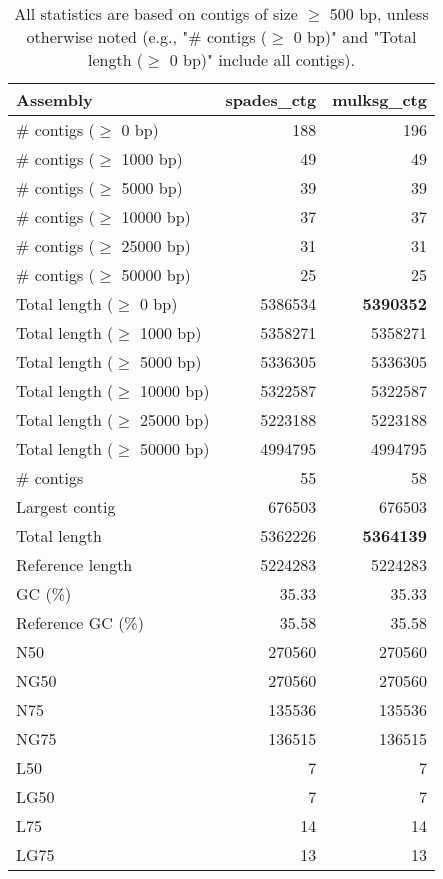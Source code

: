 \documentclass[12pt,a4paper]{article}
\begin{document}
\begin{table}[ht]
\begin{center}
\caption{All statistics are based on contigs of size $\geq$ 500 bp, unless otherwise noted (e.g., "\# contigs ($\geq$ 0 bp)" and "Total length ($\geq$ 0 bp)" include all contigs).}
\begin{tabular}{|l*{2}{|r}|}
\hline
Assembly & spades\_ctg & mulksg\_ctg \\ \hline
\# contigs ($\geq$ 0 bp) & 188 & 196 \\ \hline
\# contigs ($\geq$ 1000 bp) & 49 & 49 \\ \hline
\# contigs ($\geq$ 5000 bp) & 39 & 39 \\ \hline
\# contigs ($\geq$ 10000 bp) & 37 & 37 \\ \hline
\# contigs ($\geq$ 25000 bp) & 31 & 31 \\ \hline
\# contigs ($\geq$ 50000 bp) & 25 & 25 \\ \hline
Total length ($\geq$ 0 bp) & 5386534 & {\bf 5390352} \\ \hline
Total length ($\geq$ 1000 bp) & 5358271 & 5358271 \\ \hline
Total length ($\geq$ 5000 bp) & 5336305 & 5336305 \\ \hline
Total length ($\geq$ 10000 bp) & 5322587 & 5322587 \\ \hline
Total length ($\geq$ 25000 bp) & 5223188 & 5223188 \\ \hline
Total length ($\geq$ 50000 bp) & 4994795 & 4994795 \\ \hline
\# contigs & 55 & 58 \\ \hline
Largest contig & 676503 & 676503 \\ \hline
Total length & 5362226 & {\bf 5364139} \\ \hline
Reference length & 5224283 & 5224283 \\ \hline
GC (\%) & 35.33 & 35.33 \\ \hline
Reference GC (\%) & 35.58 & 35.58 \\ \hline
N50 & 270560 & 270560 \\ \hline
NG50 & 270560 & 270560 \\ \hline
N75 & 135536 & 135536 \\ \hline
NG75 & 136515 & 136515 \\ \hline
L50 & 7 & 7 \\ \hline
LG50 & 7 & 7 \\ \hline
L75 & 14 & 14 \\ \hline
LG75 & 13 & 13 \\ \hline

\end{tabular}
\end{center}
\end{table}
\end{document}
